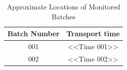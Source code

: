 \documentclass[daily]{engenius}
\begin{document}
\begin{table}[ht]
    \centering
    \begin{tabular}{|c|c|}
        \hline
        \textbf{Batch Number} & \textbf{Transport time} \\
        \hline
        001 & <<Time 001>> \\
        002 & <<Time 002>> \\
        \hline
    \end{tabular}
    \caption{Approximate Locations of Monitored Batches}
    \label{tab:batch_positions}
\end{table}


\end{document}
